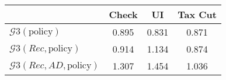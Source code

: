 \begin{tabular}{@{}lccc@{}} 
\toprule 
                          & Check      & UI    & Tax Cut    \\  \midrule 
$\mathcal{G}3(\text{policy})$ & 0.895  & 0.831  & 0.871     \\ 
$\mathcal{G}3(Rec,\text{policy})$ & 0.914  & 1.134  & 0.874     \\ 
$\mathcal{G}3(Rec, AD,\text{policy})$ & 1.307  & 1.454  & 1.036     \\ 
\end{tabular}  

